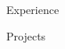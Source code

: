 \documentclass[letterpaper,11pt]{article}
\begin{document}
\header

\skills

\education{\educationCourseworkCS}

\begin{resumeSection}{Experience}
  \experienceAMD
  \experienceContestOrganizer
  \experienceWeplate
\end{resumeSection}

\awardsSectionDefault

\begin{resumeSection}{Projects}
  \projectsCPTools
  \projectsWebsite
\end{resumeSection}
\end{document}
